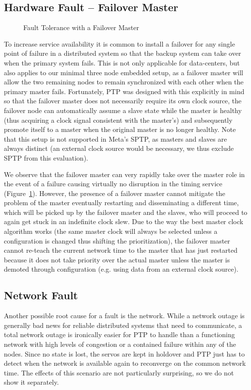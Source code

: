 \subsection{Hardware Fault -- Failover Master}

\begin{figure}
    \caption{Fault Tolerance with a Failover Master}
    \label{fig:failover}
\end{figure}

To increase service availability it is common to install a failover for any single point of failure in a distributed system so that the backup system can take over when the primary system fails. This is not only applicable for data-centers, but also applies to our minimal three node embedded setup, as a failover master will allow the two remaining nodes to remain synchronized with each other when the primary master fails. Fortunately, PTP was designed with this explicitly in mind so that the failover master does not necessarily require its own clock source, the failover node can automatically assume a slave state while the master is healthy (thus acquiring a clock signal consistent with the master's) and subsequently promote itself to a master when the original master is no longer healthy. Note that this setup is not supported in Meta's SPTP, as masters and slaves are always distinct (an external clock source would be necessary, we thus exclude SPTP from this evaluation).

We observe that the failover master can very rapidly take over the master role in the event of a failure causing virtually no disruption in the timing service (Figure~\ref{fig:failover}). However, the presence of a failover master cannot mitigate the problem of the master eventually restarting and disseminating a different time, which will be picked up by the failover master and the slaves, who will proceed to again get stuck in an indefinite clock slew. Due to the way the best master clock algorithm works (the same master clock will always be selected unless a configuration is changed thus shifting the prioritization), the failover master cannot re-teach the current network time to the master that has just restarted because it does not take priority over the actual master unless the master is demoted through configuration (e.g. using data from an external clock source).

\subsection{Network Fault}

Another possible root cause for a fault is the network. While a network outage is generally bad news for reliable distributed systems that need to communicate, a total network outage is ironically easier for PTP to handle than a functioning network with high levels of congestion or a contained failure within any of the nodes. Since no state is lost, the servos are kept in holdover and PTP just has to detect when the network is available again to reconverge on the common network time. The effects of this scenario are not particularly surprising, so we do not show it separately.
